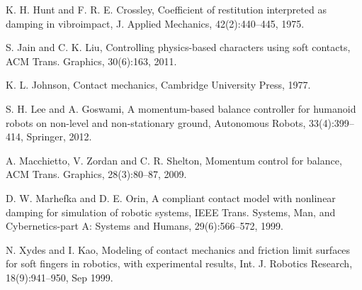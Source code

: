 \documentclass[a4paper, 11pt]{article}
\begin{document}
\begin{thebibliography}{16}
 K. H. Hunt and F. R. E. Crossley, Coefficient of
  restitution interpreted as damping in vibroimpact, J. Applied Mechanics,
  42(2):440--445, 1975.

 S. Jain and C. K. Liu, Controlling physics-based
  characters using soft contacts, ACM Trans. Graphics, 30(6):163, 2011.

 K. L. Johnson, Contact mechanics, Cambridge University
  Press, 1977.
  
 S. H. Lee and A. Goswami, A momentum-based balance
  controller for humanoid robots on non-level and non-stationary ground,
  Autonomous Robots, 33(4):399--414, Springer, 2012.

 A. Macchietto, V. Zordan and C. R. Shelton,
  Momentum control for balance, ACM Trans. Graphics, 28(3):80--87, 2009.

 D. W. Marhefka and D. E. Orin, A compliant contact
  model with nonlinear damping for simulation of robotic systems, IEEE
  Trans. Systems, Man, and Cybernetics-part A: Systems and Humans,
  29(6):566--572, 1999.

 N. Xydes and I. Kao, Modeling of contact mechanics and
  friction limit surfaces for soft fingers in robotics, with experimental
  results, Int. J. Robotics Research, 18(9):941--950, Sep 1999.

\end{thebibliography}
\end{document}
